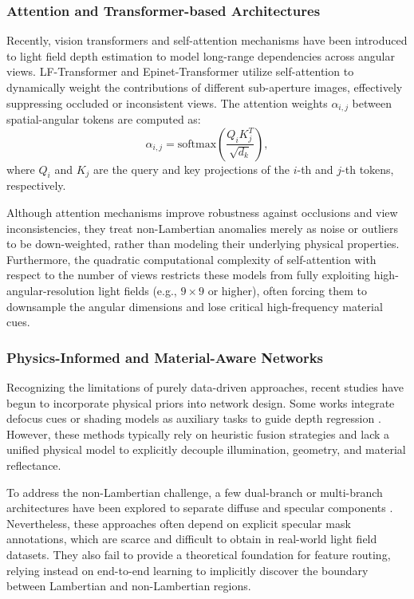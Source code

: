 \documentclass[lettersize,journal]{IEEEtran}
\begin{document}
\subsubsection{Attention and Transformer-based Architectures}
Recently, vision transformers and self-attention mechanisms have been introduced to light field depth estimation to model long-range dependencies across angular views. LF-Transformer \cite{liang2022light} and Epinet-Transformer \cite{chen2023epinet} utilize self-attention to dynamically weight the contributions of different sub-aperture images, effectively suppressing occluded or inconsistent views. The attention weights $\alpha_{i,j}$ between spatial-angular tokens are computed as:
\begin{equation}
\alpha_{i,j} = \text{softmax}\left(\frac{Q_i K_j^T}{\sqrt{d_k}}\right),
\label{eq:ch2_4}
\end{equation}
where $Q_i$ and $K_j$ are the query and key projections of the $i$-th and $j$-th tokens, respectively.

Although attention mechanisms improve robustness against occlusions and view inconsistencies, they treat non-Lambertian anomalies merely as noise or outliers to be down-weighted, rather than modeling their underlying physical properties. Furthermore, the quadratic computational complexity of self-attention with respect to the number of views restricts these models from fully exploiting high-angular-resolution light fields (e.g., $9 \times 9$ or higher), often forcing them to downsample the angular dimensions and lose critical high-frequency material cues.

\subsubsection{Physics-Informed and Material-Aware Networks}
Recognizing the limitations of purely data-driven approaches, recent studies have begun to incorporate physical priors into network design. Some works integrate defocus cues or shading models as auxiliary tasks to guide depth regression \cite{huang2021physics}. However, these methods typically rely on heuristic fusion strategies and lack a unified physical model to explicitly decouple illumination, geometry, and material reflectance. 

To address the non-Lambertian challenge, a few dual-branch or multi-branch architectures have been explored to separate diffuse and specular components \cite{zhang2022specular}. Nevertheless, these approaches often depend on explicit specular mask annotations, which are scarce and difficult to obtain in real-world light field datasets. They also fail to provide a theoretical foundation for feature routing, relying instead on end-to-end learning to implicitly discover the boundary between Lambertian and non-Lambertian regions.
\end{document}
